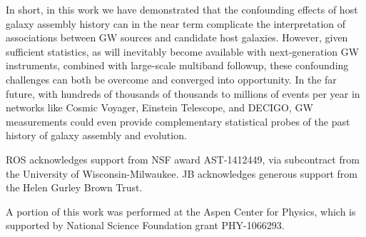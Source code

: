 \documentclass[nofootinbib,twocolumn,prd]{emulateapj}
\newcommand\jillianremark[1]{{\color{blue}#1}}
\begin{document}
In short, in this work we have demonstrated that  the confounding effects of host galaxy assembly history can in the
near term complicate the interpretation of associations between GW sources and candidate host galaxies.   However, given sufficient
statistics, as will inevitably become available with next-generation GW instruments, combined with large-scale
multiband followup, these confounding challenges can  both be overcome and converged into opportunity.   In the far future,  with hundreds of thousands of thousands to millions of events per year in
networks like Cosmic Voyager, Einstein Telescope, and DECIGO, GW measurements could even  provide complementary statistical probes of the past history of
galaxy assembly and evolution.  
%












\begin{acknowledgements}
ROS acknowledges support from NSF award AST-1412449, via subcontract from the University of Wisconsin-Milwaukee.
%
JB acknowledges generous support  from the Helen Gurley Brown Trust.

A portion of this work was performed at the Aspen Center for Physics, which is supported by National Science Foundation grant PHY-1066293.
\end{acknowledgements}







\end{document}
